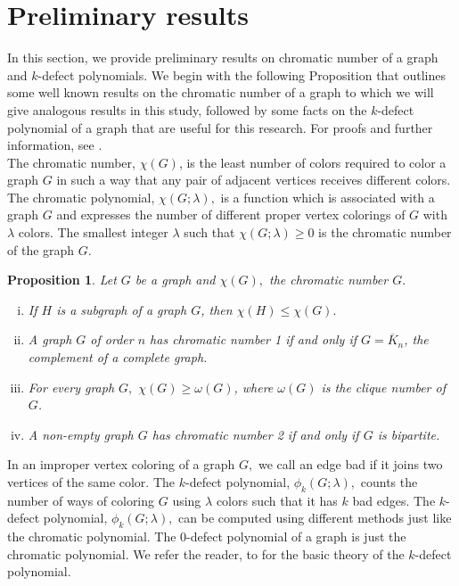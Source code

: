 \documentclass[12pt]{amsart}
\newtheorem{proposition}[theorem]{Proposition}
\theoremstyle{definition}
\theoremstyle{remark}
\numberwithin{equation}{section}
\begin{document}
\section{Preliminary results}\label{Prel}
In this section, we provide preliminary results on chromatic number of a graph and $k$-defect polynomials. We begin with the following Proposition that outlines some well known results on the chromatic number of a graph to which we will give analogous results in this study, followed by some facts on the $k$-defect polynomial of  a graph that are useful for this research. For proofs and further information, see \cite{HC69, EMB19}. \\

The  chromatic number, $\chi(G)$, is the least number of colors required  to color  a graph $G$  in such a way  that any pair of adjacent vertices  receives  different colors. The chromatic polynomial, $\chi(G;\lambda),$ is a function  which is associated with a graph $G$ and expresses the number of different  proper vertex colorings of  $G$  with $\lambda$ colors. The smallest integer $\lambda$  such that $\chi(G;\lambda) \geq 0$ is the chromatic number of the graph $G$.



\begin{proposition}
\label{Chrom}
Let $G$ be a graph and $\chi(G),$ the  chromatic number $G.$
\begin{enumerate}[(i)]
\item If $H$ is a subgraph of a graph $G$, then $\chi(H) \leq \chi(G).$
\item A graph $G$ of order $n$ has chromatic number 1 if and only if $G= \overline{K}_{n}$, the complement of a complete graph.
\item For every graph $G,$ $\chi(G) \geq \omega(G)$, where $\omega(G)$ is the clique number of $G$.
\item A non-empty  graph $G$ has chromatic number 2 if and only if  $G$ is bipartite.
 \end{enumerate}   
\end{proposition}

In an improper vertex coloring of a graph $G,$ we call  an edge   bad if it joins two vertices of the same color.  The $k$-defect polynomial, $\phi_{k}(G;\lambda),$ counts the number of ways of coloring $G$ using $\lambda$ colors such that it has $k$ bad edges. The $k$-defect polynomial,  $\phi_{k}(G;\lambda),$ can be computed using different methods just like the chromatic polynomial. The $0$-defect polynomial of a graph is just the chromatic polynomial. We refer the reader, to \cite{EMB19} for the basic theory of the $k$-defect polynomial.
\end{document}
